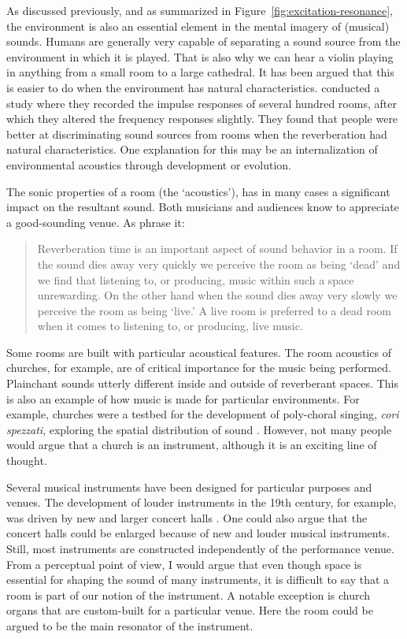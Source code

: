 As discussed previously, and as summarized in Figure~\ref{fig:excitation-resonance}, the environment is also an essential element in the mental imagery of (musical) sounds.
Humans are generally very capable of separating a sound source from the environment in which it is played. That is also why we can hear a violin playing in anything from a small room to a large cathedral. It has been argued that this is easier to do when the environment has natural characteristics. \citet{traer_perception_2016} conducted a study where they recorded the impulse responses of several hundred rooms, after which they altered the frequency responses slightly. They found that people were better at discriminating sound sources from rooms when the reverberation had natural characteristics. One explanation for this may be an internalization of environmental acoustics through development or evolution.

The sonic properties of a room (the `acoustics'), has in many cases a significant impact on the resultant sound. Both musicians and audiences know to appreciate a good-sounding venue. As \citet[p.307]{howard_acoustics_2007} phrase it:

\begin{quotation}
Reverberation time is an important aspect of sound behavior in a room. If the sound dies away very quickly we perceive the room as being `dead' and we find that listening to, or producing, music within such a space unrewarding. On the other hand when the sound dies away very slowly we perceive the room as being `live.' A live room is preferred to a dead room when it comes to listening to, or producing, live music.
\end{quotation}

Some rooms are built with particular acoustical features. The room acoustics of churches, for example, are of critical importance for the music being performed. Plainchant sounds utterly different inside and outside of reverberant spaces. This is also an example of how music is made for particular environments. For example, churches were a testbed for the development of poly-choral singing, \emph{cori spezzati}, exploring the spatial distribution of sound \citep{schiltz_cori_2018}. However, not many people would argue that a church is an instrument, although it is an exciting line of thought.

Several musical instruments have been designed for particular purposes and venues. The development of louder instruments in the 19th century, for example, was driven by new and larger concert halls \citep{denora_beethoven_1995}. One could also argue that the concert halls could be enlarged because of new and louder musical instruments. Still, most instruments are constructed independently of the performance venue. From a perceptual point of view, I would argue that even though space is essential for shaping the sound of many instruments, it is difficult to say that a room is part of our notion of the instrument. A notable exception is church organs that are custom-built for a particular venue. Here the room could be argued to be the main resonator of the instrument.


